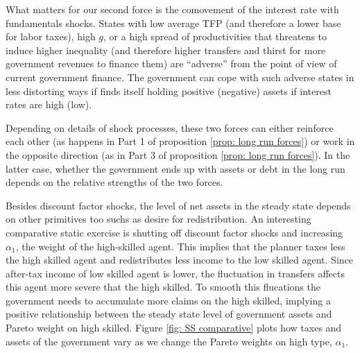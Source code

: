 \documentclass[thmsb,11pt]{article}
\begin{document}
 What matters for our second force is the comovement of the interest rate with fundamentals shocks. States with low average TFP (and therefore a lower base for labor taxes), high $g$, or a high spread of productivities that threatens to induce higher inequality (and therefore higher  transfers and thirst for more  government  revenues to finance them) are ``adverse'' from the point of view of current government finance. The government can cope with such adverse states in less distorting ways if finds itself holding positive (negative) assets if interest rates are  high (low). 

 
Depending on  details of shock processes, these two forces can
either reinforce each other (as happens in Part 1 of  proposition \ref{prop: long run forces}) or work in the opposite direction (as in Part 3 of  proposition \ref{prop: long run forces}). In the latter case, whether the
government ends up with assets or debt in the long run depends on the
relative strengths of the two forces. 
 

 Besides discount factor shocks, the level of net assets in the steady state depends on other primitives too suchs as desire for redistribution. An interesting comparative static exercise is shutting off discount factor shocks and increasing  $\alpha_1$, the weight of the high-skilled agent. This implies that the planner taxes less the high skilled agent and redistributes less income to the low skilled agent. Since after-tax income of low skilled agent is lower, the fluctuation in transfers affects this agent more severe that the high skilled. To smooth this flucations the government needs to accumulate more claims on the high skilled, implying a positive relationship between the steady state level of government assets and Pareto weight on high skilled. Figure \ref{fig: SS comparative} plots how taxes and assets of the government vary as we change the Pareto weights on high type, $\alpha_1$.

 
% 
% 
\end{document}
